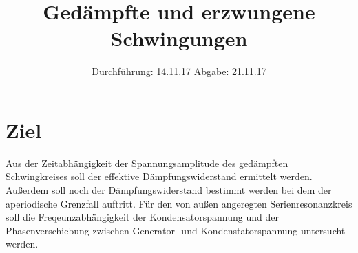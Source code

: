 

\subject{V354}
\title{Gedämpfte und erzwungene Schwingungen}
\date{%
  Durchführung: 14.11.17
  \hspace{3em}
  Abgabe: 21.11.17
}



\maketitle
\thispagestyle{empty}
\tableofcontents
\newpage

\section{Ziel}
\label{sec:Ziel}

Aus der Zeitabhängigkeit der Spannungsamplitude des gedämpften Schwingkreises soll der effektive Dämpfungswiderstand ermittelt werden.
Außerdem soll noch der Dämpfungswiderstand bestimmt werden bei dem der aperiodische Grenzfall auftritt.
Für den von außen angeregten Serienresonanzkreis soll die Freqeunzabhängigkeit der Kondensatorspannung und der Phasenverschiebung zwischen Generator- und Kondenstatorspannung untersucht werden. 






\printbibliography{}


